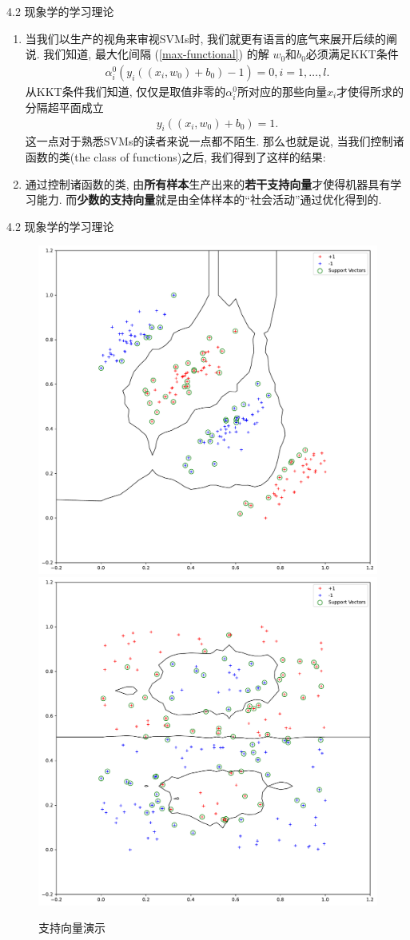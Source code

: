 \documentclass[compress,10pt,dvipsnames,notheorems]{beamer} %
\begin{document}
\begin{frame}{4.2 现象学的学习理论}
\begin{enumerate}
\item 当我们以生产的视角来审视SVMs时, 我们就更有语言的底气来展开后续的阐说. 我们知道, 最大化间隔 (\ref{max-functional}) 的解 $w_{0}$和$b_{0}$必须满足KKT条件
\begin{align}
\label{kkt}
\alpha_{i}^{0}(y_{i}((x_{i}, w_{0}) + b_{0}) - 1) = 0, i = 1, \ldots, l.
\end{align}
从KKT条件我们知道, 仅仅是取值非零的$\alpha_{i}^{0}$所对应的那些向量$x_{i}$才使得所求的分隔超平面成立
\begin{align}
\label{kkt-hyperplane}
y_{i}((x_{i}, w_{0}) + b_{0}) = 1.
\end{align}
这一点对于熟悉SVMs的读者来说一点都不陌生. 那么也就是说, 当我们控制诸函数的类(the class of functions)之后, 我们得到了这样的结果: 
\item 通过控制诸函数的类, 由\textbf{所有样本}生产出来的\textbf{若干支持向量}才使得机器具有学习能力. 而\textbf{少数的支持向量}就是由全体样本的“社会活动”通过优化得到的.
\end{enumerate}
\end{frame}

\begin{frame}{4.2 现象学的学习理论}
\begin{figure}
\includegraphics[width=.45\linewidth]{Imgs/svm-ink0.pdf}
\includegraphics[width=.45\linewidth]{Imgs/svm-xoxo.pdf}
\captionsetup{labelformat=empty}
\caption{支持向量演示}
\end{figure}
\end{frame}
\end{document}

